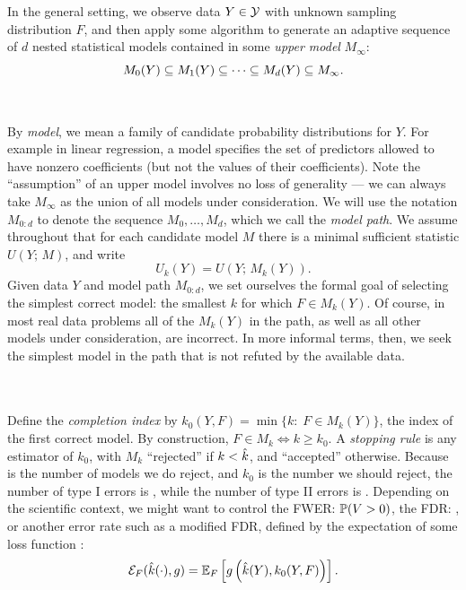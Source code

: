 \documentclass{article}
\begin{document}
In the general setting, we observe data $Y \in \cY$ with unknown sampling distribution $F$, and then apply some algorithm to generate an adaptive sequence of $d$ nested statistical models contained in some {\em upper model} $M_{\infty}$:
\[
M_0(Y) \sub M_1(Y) \sub \cdots \sub M_d(Y) \sub M_\infty.
\]
 \\
\\
By {\em model}, we mean a family of candidate probability distributions for $Y$. For example in  linear regression, a model specifies  the set of
predictors allowed to have nonzero coefficients (but not the  values of their coefficients). Note the ``assumption'' of an upper model involves no loss of generality --- we can always take $M_\infty$ as the union of all models under consideration. We will use the notation $M_{0:d}$ to denote the sequence $M_0, \ldots, M_d$, which we call the {\em model path}. We assume throughout that for each candidate model $M$ there is a minimal sufficient statistic $U(Y; \,M)$, and write
\[
U_k(Y) = U(Y; \,M_k(Y)).
\]
Given data $Y$ and model path $M_{0:d}$, we set ourselves the formal goal of selecting the simplest correct model: the smallest $k$ for which $F\in M_k(Y)$. Of course, in most real data problems all of the $M_k(Y)$ in the path, as well as all other models under consideration, are incorrect. In more informal terms, then, we seek the simplest model in the path that is not refuted by the available data.

\\
\\

Define the {\em completion index} by $k_0(Y, F) = \min\{k:\; F \in M_k(Y)\}$, the index of the first correct model. By construction, $F\in M_k \iff k \geq k_0$. A {\em stopping rule} is any estimator \smash{$\hk$} of $k_0$, with $M_k$ ``rejected'' if $k < \hk$, and ``accepted'' otherwise. Because \smash{$\hk$} is the number of models we do reject, and $k_0$ is the number we should reject, the number of type I errors is , while the number of type II errors is . Depending on the scientific context, we might want to control the FWER: $\P(V>0)$, the FDR: \smash{$\E[V/\hk; \hk>0]$}, or another error rate such as a modified FDR, defined by the expectation of some loss function :
\begin{equation}\label{eq:errRate}
\Err_F(\hk(\cdot), g) = \E_F\left[ g\left(\hk(Y), k_0(Y, F)\right)\right].
\end{equation}
\end{document}
